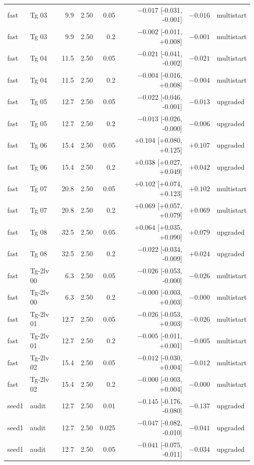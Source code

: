\begin{longtable}{@{}llrrrrrl@{}}
fast & Tg 03 & 9.9 & 2.50 & 0.05 & $-0.017$ [-0.031, -0.001] & $-0.016$ & multistart\\
fast & Tg 03 & 9.9 & 2.50 & 0.2 & $-0.002$ [-0.011, +0.008] & $-0.001$ & multistart\\
fast & Tg 04 & 11.5 & 2.50 & 0.05 & $-0.021$ [-0.041, -0.002] & $-0.021$ & multistart\\
fast & Tg 04 & 11.5 & 2.50 & 0.2 & $-0.004$ [-0.016, +0.008] & $-0.004$ & multistart\\
fast & Tg 05 & 12.7 & 2.50 & 0.05 & $-0.022$ [-0.046, -0.001] & $-0.013$ & upgraded\\
fast & Tg 05 & 12.7 & 2.50 & 0.2 & $-0.013$ [-0.026, -0.000] & $-0.006$ & upgraded\\
fast & Tg 06 & 15.4 & 2.50 & 0.05 & $+0.104$ [+0.080, +0.125] & $+0.107$ & upgraded\\
fast & Tg 06 & 15.4 & 2.50 & 0.2 & $+0.038$ [+0.027, +0.049] & $+0.042$ & upgraded\\
fast & Tg 07 & 20.8 & 2.50 & 0.05 & $+0.102$ [+0.074, +0.123] & $+0.102$ & multistart\\
fast & Tg 07 & 20.8 & 2.50 & 0.2 & $+0.069$ [+0.057, +0.079] & $+0.069$ & multistart\\
fast & Tg 08 & 32.5 & 2.50 & 0.05 & $+0.064$ [+0.035, +0.090] & $+0.079$ & upgraded\\
fast & Tg 08 & 32.5 & 2.50 & 0.2 & $-0.022$ [-0.034, -0.009] & $+0.024$ & upgraded\\
fast & Tg-2lv 00 & 6.3 & 2.50 & 0.05 & $-0.026$ [-0.053, -0.000] & $-0.026$ & multistart\\
fast & Tg-2lv 00 & 6.3 & 2.50 & 0.2 & $-0.000$ [-0.003, +0.003] & $-0.000$ & multistart\\
fast & Tg-2lv 01 & 12.7 & 2.50 & 0.05 & $-0.026$ [-0.053, +0.003] & $-0.026$ & multistart\\
fast & Tg-2lv 01 & 12.7 & 2.50 & 0.2 & $-0.005$ [-0.011, +0.001] & $-0.005$ & multistart\\
fast & Tg-2lv 02 & 15.4 & 2.50 & 0.05 & $-0.012$ [-0.030, +0.004] & $-0.012$ & multistart\\
fast & Tg-2lv 02 & 15.4 & 2.50 & 0.2 & $-0.000$ [-0.003, +0.004] & $-0.000$ & multistart\\
seed1 & audit & 12.7 & 2.50 & 0.01 & $-0.145$ [-0.176, -0.080] & $-0.137$ & upgraded\\
seed1 & audit & 12.7 & 2.50 & 0.025 & $-0.047$ [-0.082, -0.010] & $-0.041$ & upgraded\\
seed1 & audit & 12.7 & 2.50 & 0.05 & $-0.041$ [-0.075, -0.011] & $-0.034$ & upgraded\\

\end{longtable}
